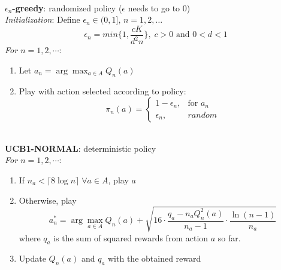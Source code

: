 \documentclass[conference]{IEEEtran}
\begin{document}
\-\\
\textbf{$\epsilon_n$-greedy}: randomized policy ($\epsilon$ needs to go to 0)\\
\emph{Initialization}: Define $\epsilon_n \in (0,1],\,n=1,2,\dots$
\begin{equation*}
	\epsilon_n = min\{1, \frac{cK}{d^2n}\},\; c > 0 \text{ and }0 < d < 1 
\end{equation*}
\emph{For $n=1,2,\cdots$}: 
\begin{enumerate}
	\item Let $a_n = \arg\max_{a\in A} Q_n(a)$
	\item Play with action selected according to policy:
	\begin{equation*}
		\pi_n(a) = 
		\begin{cases}
			1 - \epsilon_n, & \text{for } a_n\\
			\epsilon_n, & random
		\end{cases}
	\end{equation*}
\end{enumerate}


\-\\
\textbf{UCB1-NORMAL}: deterministic policy \\
\emph{For $n=1,2,\cdots$}: 
\begin{enumerate}
	\item If $n_a < \lceil8\log{n}\rceil \; \forall a \in A$, play $a$
	\item Otherwise, play
	\begin{equation*}
		a^{*}_n = \arg\max_{a \in A} Q_n(a) + \sqrt{16 \cdot \frac{q_a - n_a Q^2_n(a)}{n_a - 1} \cdot \frac{\ln(n-1)}{n_a}}
	\end{equation*}
	\noindent where $q_a$ is the sum of squared rewards from action $a$ so far.
	\item Update $Q_n(a)$ and $q_a$ with the obtained reward
\end{enumerate}


%
%
%

\-\\
\end{document}
